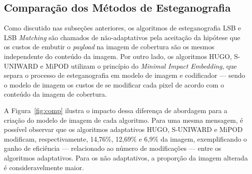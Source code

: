 \subsection{Comparação dos Métodos de Esteganografia}


Como discutido nas subseções anteriores, os algoritmos de esteganografia LSB e LSB \textit{Matching} são chamados de não-adaptativos pela aceitação da hipótese que os custos de embutir o \textit{payload} na imagem de cobertura são os mesmos independente do conteúdo da imagem. Por outro lado, os algoritmos HUGO, S-UNIWARD e MiPOD utilizam o princípio do \textit{Minimal Impact Embedding}, que separa o processo de esteganografia em modelo de imagem e codificador --- sendo o modelo de imagem os custos de se modificar cada pixel de acordo com o conteúdo da imagem de cobertura.

A Figura~\ref{fig:comp} ilustra o impacto dessa diferença de abordagem para a criação do modelo de imagem de cada algoritmo. Para uma mesma mensagem, é possível observar que os algoritmos adaptativos HUGO, S-UNIWARD e MiPOD modificam, respectivamente, 14,76\%, 12,69\% e 6,9\% da imagem, exemplificando o ganho de eficiência --- relacionado ao número de modificações --- entre os algoritmos adaptativos. Para os não adaptativos, a proporção da imagem alterada é consideravelmente maior.

